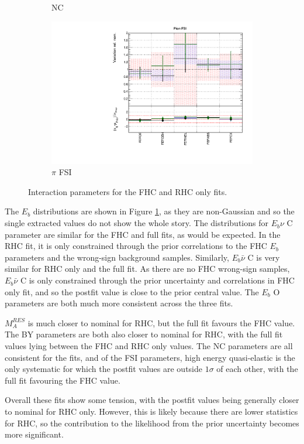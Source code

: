 \begin{figure}
\begin{subfigure}{0.49\textwidth}
  \caption{NC}
\end{subfigure}
\begin{subfigure}{0.49\textwidth}
  \centering
  \includegraphics[width=0.9\linewidth]{figs/fhcrhcfitsxsec_5}
  \caption{$\pi$ FSI}
\end{subfigure}
\caption{Interaction parameters for the FHC and RHC only fits.}
\label{fig:fhcrhcxsec}
\end{figure}

The $E_b$ distributions are shown in Figure \ref{fig:fhcrhcxsec}, as they are non-Gaussian and so the single extracted values do not show the whole story. The distributions for $E_b \nu$ C parameter are similar for the FHC and full fits, as would be expected. In the RHC fit, it is only constrained through the prior correlations to the FHC $E_b$ parameters and the wrong-sign background samples. Similarly, $E_b \bar{\nu}$ C is very similar for RHC only and the full fit. As there are no FHC wrong-sign samples, $E_b \bar{\nu}$ C is only constrained through the prior uncertainty and correlations in FHC only fit, and so the postfit value is close to the prior central value. The $E_b$ O parameters are both much more consistent across the three fits.

$M_{A}^{RES}$ is much closer to nominal for RHC, but the full fit favours the FHC value. The BY parameters are both also closer to nominal for RHC, with the full fit values lying between the FHC and RHC only values. The NC parameters are all consistent for the fits, and of the FSI parameters, high energy quasi-elastic is the only systematic for which the postfit values are outside $1\sigma$ of each other, with the full fit favouring the FHC value.

Overall these fits show some tension, with the postfit values being generally closer to nominal for RHC only. However, this is likely because there are lower statistics for RHC, so the contribution to the likelihood from the prior uncertainty becomes more significant.

